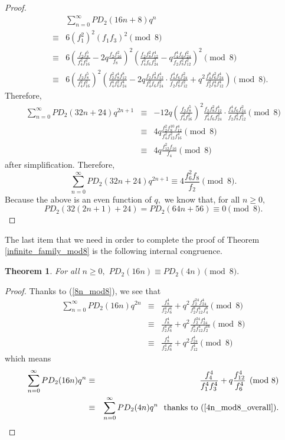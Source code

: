\documentclass{amsart}
\newtheorem{theorem}{Theorem}[section]
\begin{document}
\begin{proof}
\begin{eqnarray*}
&& \sum_{n=0}^\infty PD_2(16n+8)q^{n} \\
\ \ \ \ &\equiv & 
6 (f_1^2)^2(f_1f_3)^2 \pmod{8} \\
\ \ \ \ &\equiv & 
6\left( \frac{f_2f_8^5}{f_4^2f_{16}^2} -2q\frac{f_2f_{16}^2}{f_8}\right)^2 \left( \frac{f_2f_8^2f_{12}^4}{f_4^2f_6f_{24}^2} - q \frac{f_4^4f_6f_{24}^2}{f_2f_8^2f_{12}^2}\right)^2 \pmod{8} \\
\ \ \ \ &\equiv & 
6\left( \frac{f_2f_8^5}{f_4^2f_{16}^2} \right)^2 \left( \frac{f_2^2f_8^4f_{12}^8}{f_4^4f_6^2f_{24}^4} - 2q \frac{f_2f_8^2f_{12}^4}{f_4^2f_6f_{24}^2}\cdot \frac{f_4^4f_6f_{24}^2}{f_2f_8^2f_{12}^2} + q^2\frac{f_4^8f_6^2f_{24}^4}{f_2^2f_8^4f_{12}^4}\right) \pmod{8}.
\end{eqnarray*}
Therefore, 
\begin{eqnarray*}
\sum_{n=0}^\infty PD_2(32n+24)q^{2n+1} 
&\equiv & 
-12q\left( \frac{f_2f_8^5}{f_4^2f_{16}^2} \right)^2 \frac{f_2f_8^2f_{12}^4}{f_4^2f_6f_{24}^2}\cdot \frac{f_4^4f_6f_{24}^2}{f_2f_8^2f_{12}^2}  \pmod{8} \\
&\equiv & 
4q\frac{f_2^2f_8^{10}f_{12}^4}{f_{4}^2f_{12}^2f_{16}^4}  \pmod{8} \\
&\equiv & 
4q\frac{f_{12}^2f_{16}}{f_{4}}  \pmod{8} 
\end{eqnarray*}
after simplification.  Therefore, 
$$\sum_{n=0}^\infty PD_2(32n+24)q^{2n+1} 
\equiv 
4\frac{f_{6}^2f_{8}}{f_{2}}  \pmod{8}.
$$
Because the above is an even function of $q,$ we know that, for all $n\geq 0,$ $$PD_2(32(2n+1)+24) = PD_2(64n+56) \equiv 0 \pmod{8}.$$
\end{proof}
The last item that we need in order to complete the proof of Theorem \ref{infinite_family_mod8} is the following internal congruence.  
\begin{theorem}
\label{internal_cong_mod8}
For all $n\geq 0,$ $PD_2(16n) \equiv PD_2(4n) \pmod{8}.$
\end{theorem}
\begin{proof}
Thanks to (\ref{8n_mod8}), we see that 
\begin{eqnarray*}
\sum_{n=0}^\infty PD_2(16n)q^{2n} 
&\equiv & 
\frac{f_8^4}{f_2^4f_6^{4}} +q^2\frac{f_2^{24}f_{24}^4}{f_2^{8}f_{12}^4f_4^8} \pmod{8} \\
&\equiv & 
\frac{f_8^4}{f_2^4f_6^{4}} +q^2\frac{f_2^{24}f_{24}^4}{f_2^{8}f_{12}^4f_2^{16}} \pmod{8} \\
&\equiv & 
\frac{f_8^4}{f_2^4f_6^{4}} +q^2\frac{f_{24}^4}{f_{12}^4} \pmod{8} 
\end{eqnarray*}
which means 
\begin{eqnarray*}
\sum_{n=0}^\infty PD_2(16n)q^{n} 
&\equiv & 
\frac{f_4^4}{f_1^4f_3^{4}} +q\frac{f_{12}^4}{f_{6}^4} \pmod{8} \\
&\equiv & 
\sum_{n=0}^\infty PD_2(4n)q^{n}  \textrm{\ \ thanks to (\ref{4n_mod8_overall})}.
\end{eqnarray*}
\end{proof}
\end{document}
